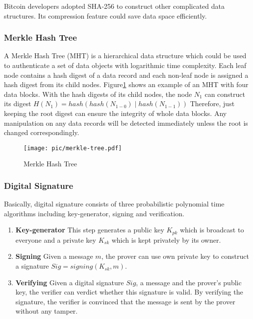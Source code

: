 \documentclass[conference]{IEEEtran}
\begin{document}
Bitcoin developers adopted SHA-256 to construct other complicated data structures. Its compression feature could save data space efficiently.

\subsubsection{Merkle Hash Tree\cite{merkle1989certified}}
A Merkle Hash Tree (MHT) is a hierarchical data structure which could be used to authenticate a set of data objects with logarithmic time complexity.
%
Each leaf node contains a hash digest of a data record and each non-leaf node is assigned a hash digest from its child nodes.
%
Figure\ref{Merkle} shows an example of an MHT with four data blocks.
%
With the hash digests of its child nodes, the node $N_1$ can construct its digest $H(N_1) = hash(hash(N_{1-0}) \mid hash(N_{1-1}))$
%
Therefore, just keeping the root digest can ensure the integrity of whole data blocks.
%
Any manipulation on any data records will be detected immediately unless the root is changed correspondingly.

\begin{figure}[ht]
    \centering
    \texttt{[image: pic/merkle-tree.pdf]}
    \caption{Merkle Hash Tree}
    \label{Merkle}
\end{figure}

\subsubsection{Digital Signature}
Basically, digital signature consists of three probabilistic polynomial time algorithms including key-generator, signing and verification.

\begin{enumerate}
    \item \textbf{Key-generator} This step generates a public key $K_{pk}$ which is broadcast to everyone and a private key $K_{sk}$ which is kept privately by its owner.
    \item \textbf{Signing} Given a message $m$, the prover can use own private key to construct a signature $Sig = signing(K_{sk},m)$.
    \item \textbf{Verifying} Given a digital signature $Sig$, a message and the prover's public key, the verifier can verdict whether this signature is valid.
          By verifying the signature, the verifier is convinced that the message is sent by the prover without any tamper. 
\end{enumerate}
\end{document}
